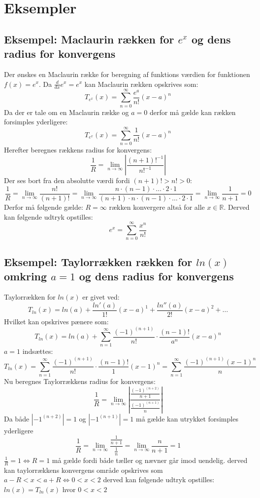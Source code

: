 \section{Eksempler}
\subsection*{\textbf{Eksempel:} Maclaurin rækken for $e^x$ og dens radius for konvergens} 
Der ønskes en Maclaurin række for beregning af funktions værdien for funktionen $f(x) = e^x$.
Da $\frac{d}{dx}e^x = e^x$ kan Maclaurin rækken opskrives som:
\[
    T_{e^x}(x) = \sum^\infty_{n = 0} \frac{e^a}{n!}(x-a)^n
\]
Da der er tale om en Maclaurin række og $a = 0$ derfor må gælde kan rækken forsimples yderligere:
\[
    T_{e^x}(x) = \sum^\infty_{n = 0} \frac{1}{n!}(x-a)^n
\]
Herefter beregnes rækkens radius for konvergens:
\[
    \frac{1}{R} = \lim_{n \rightarrow \infty} \left\lvert \frac{(n + 1)!^{-1}}{n!^{-1}} \right\lvert
\]
Der ses bort fra den absolutte værdi fordi $(n + 1)! > n! > 0$:
\[
    \frac{1}{R}= \lim_{n \rightarrow \infty} \frac{n!}{(n + 1)!} 
    = \lim_{n \rightarrow \infty} \frac{n \cdot (n-1) \cdot \ldots \cdot 2 \cdot 1}{(n + 1) \cdot n \cdot (n-1) \cdot \ldots \cdot 2 \cdot 1}
    = \lim_{n \rightarrow \infty} \frac{1}{n + 1} = 0
\]
Derfor må følgende gælde: $R = \infty$ rækken konvergere altså for alle $x \in \mathbb{R}$.
Derved kan følgende udtryk opstilles:
\[
    e^x = \sum^\infty_{n = 0} \frac{x^n}{n!}  
\]
\subsection*{\textbf{Eksempel:} Taylorrækken rækken for $ln(x)$ omkring $a = 1$ og dens radius for konvergens} %
Taylorrækken for $ln(x)$ er givet ved:
\[
    T_{ln}(x) = ln(a) + \frac{ln'(a)}{1!}(x-a)^1 + \frac{ln''(a)}{2!}(x-a)^2 + \ldots
\]
Hvilket kan opskrives pænere som:
\[
    T_{ln}(x) = ln(a) + \sum^{\infty}_{n = 1} \frac{(-1)^{(n+1)}}{n!} \cdot \frac{(n-1)!}{a^n} (x-a)^{n}
\]
$a = 1$ indsættes:
\[
    T_{ln}(x) = \sum^{\infty}_{n = 1} \frac{(-1)^{(n+1)}}{n!} \cdot \frac{(n-1)!}{1} (x-1)^{n}
    = \sum^{\infty}_{n = 1} \frac{(-1)^{(n+1)}(x-1)^{n}}{n}
\]
Nu beregnes Taylorrækkens radius for konvergens: 
\[
    \frac{1}{R} = \lim_{n \rightarrow \infty} \left\lvert \frac{\frac{(-1)^{(n+2)}}{n+1}}{\frac{(-1)^{(n+1)}}{n}} \right\lvert
\]
Da både $\left\lvert -1^{(n+2)} \right\lvert = 1$ og $\left\lvert-1^{(n + 1)} \right\lvert = 1$ må gælde kan utrykket forsimples yderligere
\[
    \frac{1}{R} = \lim_{n \rightarrow \infty} \frac{\frac{1}{n+1}}{\frac{1}{n}} = \lim_{n \rightarrow \infty} \frac{n}{n+1} = 1
\]
$\frac{1}{R} = 1 \Leftrightarrow R = 1$ må gælde fordi både tæller og nævner går imod uendelig. 
derved kan taylorrækkens konvergens område opskrives som $a-R < x < a+R \Leftrightarrow 0 < x < 2$ 
derved kan følgende udtryk opstilles: $ln(x) = T_{ln}(x)$ hvor $ 0 < x < 2$